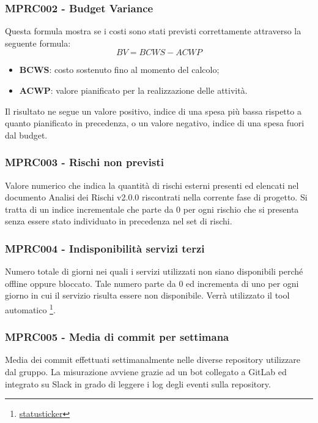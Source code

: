 {\subsubsection{MPRC002 - Budget Variance}
Questa formula mostra se i costi sono stati previsti correttamente attraverso la seguente formula:
\begin{displaymath}
    BV = BCWS - ACWP
\end{displaymath}
\begin{itemize}
    \item \textbf{BCWS}: costo sostenuto fino al momento del calcolo;
    \item \textbf{ACWP}: valore pianificato per la realizzazione delle attività.
\end{itemize}
Il risultato ne segue un valore positivo, indice di una spesa più bassa rispetto a quanto pianificato in precedenza, o un valore negativo, indice di una spesa fuori dal budget.

\subsubsection{MPRC003 - Rischi non previsti}
Valore numerico che indica la quantità di rischi esterni presenti ed elencati nel documento Analisi dei Rischi v2.0.0 riscontrati nella corrente fase di progetto. Si tratta di un indice incrementale che parte da 0 per ogni rischio che si presenta senza essere stato individuato in precedenza nel set di rischi.
\subsubsection{MPRC004 - Indisponibilità servizi terzi}
Numero totale di giorni nei quali i servizi utilizzati non siano disponibili perché offline oppure bloccato. Tale numero parte da 0 ed incrementa di uno per ogni giorno in cui il servizio risulta essere non disponibile. Verrà utilizzato il tool automatico \footnote{\href{https://statusticker.com/}{statusticker}}.
\subsubsection{MPRC005 - Media di commit per settimana}
Media dei commit effettuati settimanalmente nelle diverse repository utilizzare dal gruppo. La misurazione avviene grazie ad un bot collegato a GitLab ed integrato su Slack in grado di leggere i log degli eventi sulla repository.
}
